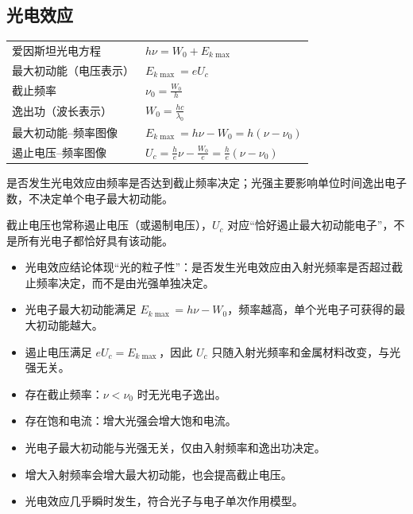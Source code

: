 
\subsection{光电效应}
\begin{tabularx}{\columnwidth}{XX}
  爱因斯坦光电方程&$h\nu=W_0+E_{k\max}$\\
  最大初动能（电压表示）&$E_{k\max}=eU_c$\\
  截止频率&\(\nu_0=\frac{W_0}{h}\)\\
  逸出功（波长表示）&\(W_0=\frac{hc}{\lambda_0}\)\\
  最大初动能--频率图像&\(E_{k\max}=h\nu-W_0=h(\nu-\nu_0)\)\\
  遏止电压--频率图像&\(U_c=\frac{h}{e}\nu-\frac{W_0}{e}=\frac{h}{e}(\nu-\nu_0)\)\\
\end{tabularx}

\begin{formulanotebox}
是否发生光电效应由频率是否达到截止频率决定；光强主要影响单位时间逸出电子数，不决定单个电子最大初动能。

截止电压也常称遏止电压（或遏制电压），$U_c$ 对应“恰好遏止最大初动能电子”，不是所有光电子都恰好具有该动能。
\end{formulanotebox}

\begin{keypointbox}
\begin{itemize}[leftmargin=1.5em]
  \item 光电效应结论体现“光的粒子性”：是否发生光电效应由入射光频率是否超过截止频率决定，而不是由光强单独决定。
  \item 光电子最大初动能满足 $E_{k\max}=h\nu-W_0$，频率越高，单个光电子可获得的最大初动能越大。
  \item 遏止电压满足 $eU_c=E_{k\max}$，因此 $U_c$ 只随入射光频率和金属材料改变，与光强无关。
\end{itemize}
\end{keypointbox}

\begin{casetypebox}[title={\strut\textcolor{white}{\bfseries 高频结论：光电效应实验现象}}]
\begin{itemize}[leftmargin=1.5em]
  \item 存在截止频率：$\nu<\nu_0$ 时无光电子逸出。
  \item 存在饱和电流：增大光强会增大饱和电流。
  \item 光电子最大初动能与光强无关，仅由入射频率和逸出功决定。
  \item 增大入射频率会增大最大初动能，也会提高截止电压。
  \item 光电效应几乎瞬时发生，符合光子与电子单次作用模型。
\end{itemize}
\end{casetypebox}

